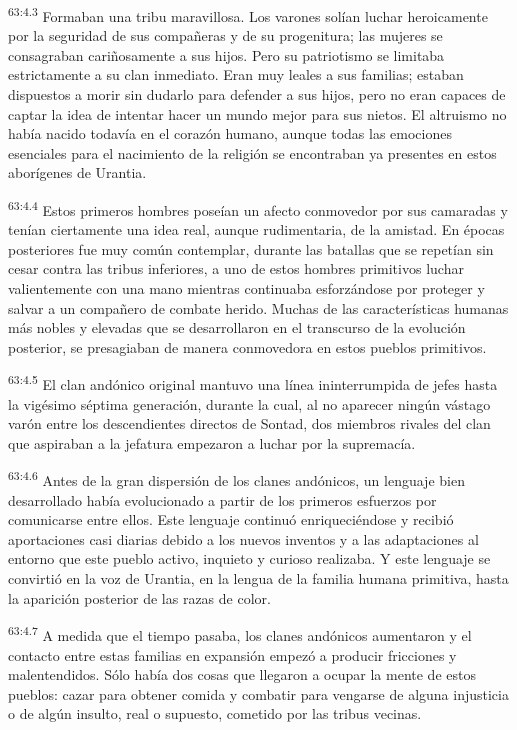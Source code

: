 \par
\textsuperscript{63:4.3} Formaban una tribu maravillosa. Los varones solían luchar heroicamente por la seguridad de sus compañeras y de su progenitura; las mujeres se consagraban cariñosamente a sus hijos. Pero su patriotismo se limitaba estrictamente a su clan inmediato. Eran muy leales a sus familias; estaban dispuestos a morir sin dudarlo para defender a sus hijos, pero no eran capaces de captar la idea de intentar hacer un mundo mejor para sus nietos. El altruismo no había nacido todavía en el corazón humano, aunque todas las emociones esenciales para el nacimiento de la religión se encontraban ya presentes en estos aborígenes de Urantia.

\par
\textsuperscript{63:4.4} Estos primeros hombres poseían un afecto conmovedor por sus camaradas y tenían ciertamente una idea real, aunque rudimentaria, de la amistad. En épocas posteriores fue muy común contemplar, durante las batallas que se repetían sin cesar contra las tribus inferiores, a uno de estos hombres primitivos luchar valientemente con una mano mientras continuaba esforzándose por proteger y salvar a un compañero de combate herido. Muchas de las características humanas más nobles y elevadas que se desarrollaron en el transcurso de la evolución posterior, se presagiaban de manera conmovedora en estos pueblos primitivos.

\par
\textsuperscript{63:4.5} El clan andónico original mantuvo una línea ininterrumpida de jefes hasta la vigésimo séptima generación, durante la cual, al no aparecer ningún vástago varón entre los descendientes directos de Sontad, dos miembros rivales del clan que aspiraban a la jefatura empezaron a luchar por la supremacía.

\par
\textsuperscript{63:4.6} Antes de la gran dispersión de los clanes andónicos, un lenguaje bien desarrollado había evolucionado a partir de los primeros esfuerzos por comunicarse entre ellos. Este lenguaje continuó enriqueciéndose y recibió aportaciones casi diarias debido a los nuevos inventos y a las adaptaciones al entorno que este pueblo activo, inquieto y curioso realizaba. Y este lenguaje se convirtió en la voz de Urantia, en la lengua de la familia humana primitiva, hasta la aparición posterior de las razas de color.

\par
\textsuperscript{63:4.7} A medida que el tiempo pasaba, los clanes andónicos aumentaron y el contacto entre estas familias en expansión empezó a producir fricciones y malentendidos. Sólo había dos cosas que llegaron a ocupar la mente de estos pueblos: cazar para obtener comida y combatir para vengarse de alguna injusticia o de algún insulto, real o supuesto, cometido por las tribus vecinas.

